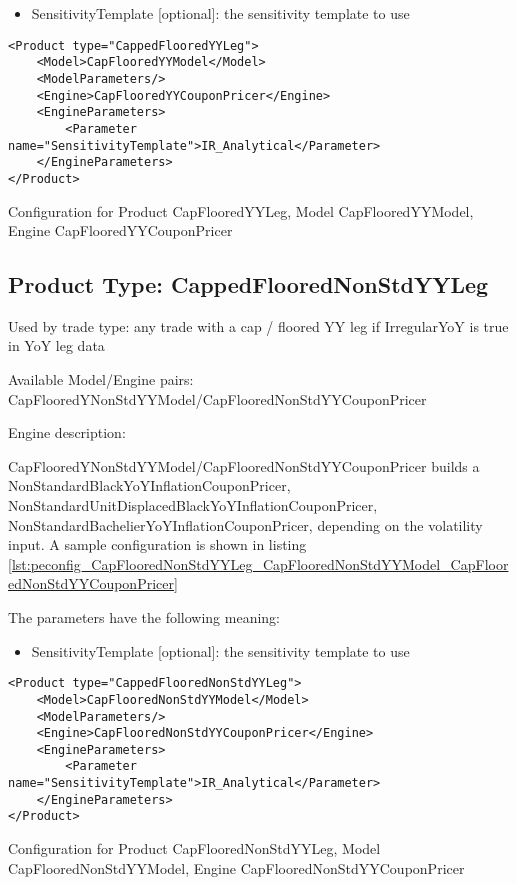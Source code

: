 \begin{itemize}
\item SensitivityTemplate [optional]: the sensitivity template to use 
\end{itemize}

\begin{longlisting}
\begin{verbatim}
<Product type="CappedFlooredYYLeg">
    <Model>CapFlooredYYModel</Model>
    <ModelParameters/>
    <Engine>CapFlooredYYCouponPricer</Engine>
    <EngineParameters>
        <Parameter name="SensitivityTemplate">IR_Analytical</Parameter>
    </EngineParameters>
</Product>
\end{verbatim}
\caption{Configuration for Product CapFlooredYYLeg, Model CapFlooredYYModel, Engine CapFlooredYYCouponPricer}
\label{lst:peconfig_CapFlooredYYLeg_CapFlooredYYModel_CapFlooredYYCouponPricer}
\end{longlisting}

\subsection{Product Type: CappedFlooredNonStdYYLeg}

Used by trade type: any trade with a cap / floored YY leg if IrregularYoY is true in YoY leg data

Available Model/Engine pairs: CapFlooredYNonStdYYModel/CapFlooredNonStdYYCouponPricer

Engine description:

CapFlooredYNonStdYYModel/CapFlooredNonStdYYCouponPricer builds a NonStandardBlackYoYInflationCouponPricer,
NonStandardUnitDisplacedBlackYoYInflationCouponPricer, NonStandardBachelierYoYInflationCouponPricer, depending on the
volatility input. A sample configuration is shown in listing
\ref{lst:peconfig_CapFlooredNonStdYYLeg_CapFlooredNonStdYYModel_CapFlooredNonStdYYCouponPricer}

The parameters have the following meaning:

\begin{itemize}
\item SensitivityTemplate [optional]: the sensitivity template to use 
\end{itemize}

\begin{longlisting}
\begin{verbatim}
<Product type="CappedFlooredNonStdYYLeg">
    <Model>CapFlooredNonStdYYModel</Model>
    <ModelParameters/>
    <Engine>CapFlooredNonStdYYCouponPricer</Engine>
    <EngineParameters>
        <Parameter name="SensitivityTemplate">IR_Analytical</Parameter>
    </EngineParameters>
</Product>
\end{verbatim}
\caption{Configuration for Product CapFlooredNonStdYYLeg, Model CapFlooredNonStdYYModel, Engine
  CapFlooredNonStdYYCouponPricer}
\label{lst:peconfig_CapFlooredNonStdYYLeg_CapFlooredNonStdYYModel_CapFlooredNonStdYYCouponPricer}
\end{longlisting}

